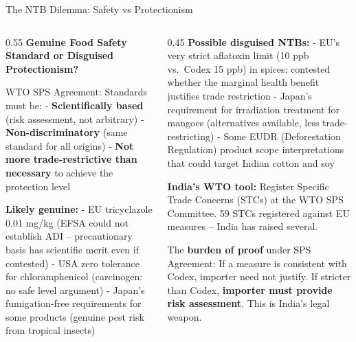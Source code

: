 \documentclass[
  ignorenonframetext,
  aspectratio=169,
]{beamer}
\makeatletter
\let\quarto@originallabel\label
\DeclareRobustCommand*{\label}[1]{\quarto@originallabel{#1}}
\makeatother
\begin{document}
\begin{frame}{The NTB Dilemma: Safety vs Protectionism}
\label{the-ntb-dilemma-safety-vs-protectionism}
\begin{columns}[T]
\begin{column}{0.55\linewidth}
\textbf{Genuine Food Safety Standard or Disguised Protectionism?}

WTO SPS Agreement: Standards must be: - \textbf{Scientifically based}
(risk assessment, not arbitrary) - \textbf{Non-discriminatory} (same
standard for all origins) - \textbf{Not more trade-restrictive than
necessary} to achieve the protection level

\textbf{Likely genuine:} - EU tricyclazole 0.01 mg/kg (EFSA could not
establish ADI -- precautionary basis has scientific merit even if
contested) - USA zero tolerance for chloramphenicol (carcinogen: no safe
level argument) - Japan's fumigation-free requirements for some products
(genuine pest risk from tropical insects)
\end{column}

\begin{column}{0.45\linewidth}
\textbf{Possible disguised NTBs:} - EU's very strict aflatoxin limit (10
ppb vs.~Codex 15 ppb) in spices: contested whether the marginal health
benefit justifies trade restriction - Japan's requirement for
irradiation treatment for mangoes (alternatives available, less
trade-restricting) - Some EUDR (Deforestation Regulation) product scope
interpretations that could target Indian cotton and soy

\textbf{India's WTO tool:} Register Specific Trade Concerns (STCs) at
the WTO SPS Committee. 59 STCs registered against EU measures -- India
has raised several.

The \textbf{burden of proof} under SPS Agreement: If a measure is
consistent with Codex, importer need not justify. If stricter than
Codex, \textbf{importer must provide risk assessment}. This is India's
legal weapon.
\end{column}
\end{columns}
\end{frame}
\end{document}
